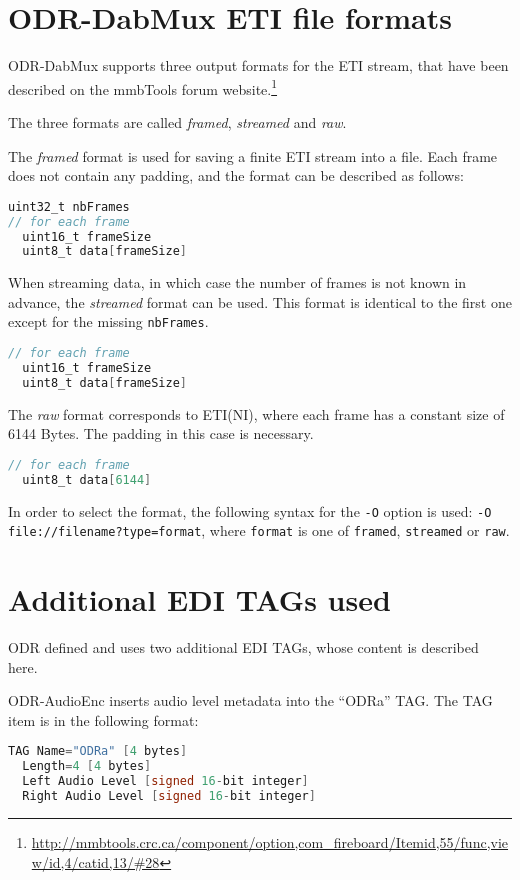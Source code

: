 
\section{ODR-DabMux ETI file formats}
\label{etiformat}
ODR-DabMux supports three output formats for the ETI stream, that have been described on the mmbTools forum
website.\footnote{\url{http://mmbtools.crc.ca/component/option,com\_fireboard/Itemid,55/func,view/id,4/catid,13/\#28}}

The three formats are called \emph{framed}, \emph{streamed} and \emph{raw}.

The \emph{framed} format is used for saving a finite ETI stream into a file. Each frame does not contain any padding, and the
format can be described as follows:
\begin{lstlisting}[language=C]
uint32_t nbFrames
// for each frame
  uint16_t frameSize
  uint8_t data[frameSize]
\end{lstlisting}

When streaming data, in which case the number of frames is not known in advance, the \emph{streamed} format can be used.
This format is identical to the first one except for the missing \texttt{nbFrames}.
\begin{lstlisting}[language=C]
// for each frame
  uint16_t frameSize
  uint8_t data[frameSize]
\end{lstlisting}

The \emph{raw} format corresponds to ETI(NI), where each frame has a constant size of 6144 Bytes. The padding in this
case is necessary.
\begin{lstlisting}[language=C]
// for each frame
  uint8_t data[6144]
\end{lstlisting}

In order to select the format, the following syntax for the \texttt{-O} option is used:
\texttt{-O file://filename?type=format}, where \texttt{format} is one of \verb+framed+, \verb+streamed+ or
\verb+raw+.


\section{Additional EDI TAGs used}
ODR defined and uses two additional EDI TAGs, whose content is described here.

ODR-AudioEnc inserts audio level metadata into the ``ODRa'' TAG. The TAG item is in the following format:
\begin{lstlisting}[language=C]
  TAG Name="ODRa" [4 bytes]
  Length=4 [4 bytes]
  Left Audio Level [signed 16-bit integer]
  Right Audio Level [signed 16-bit integer]
\end{lstlisting}


